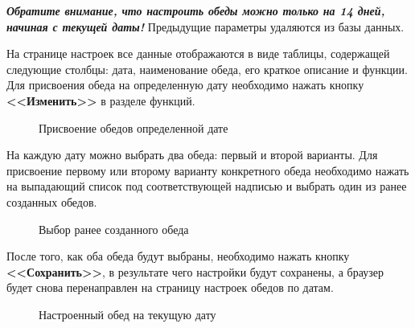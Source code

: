 \documentclass[a4paper]{article}
\begin{document}
\textbf{\textit{Обратите внимание, что настроить обеды можно только на 14 дней, начиная с текущей даты!}} Предыдущие параметры удаляются из базы данных.

На странице настроек все данные отображаются в виде таблицы, содержащей следующие столбцы: дата, наименование обеда, его краткое описание и функции. Для присвоения обеда на определенную дату необходимо нажать кнопку \textbf{<<Изменить>>} в разделе функций.

\begin{figure}[h]
\caption{Присвоение обедов определенной дате}
\label{fig:image22}
\end{figure}

На каждую дату можно выбрать два обеда: первый и второй варианты. Для присвоение первому или второму варианту конкретного обеда необходимо нажать на выпадающий список под соответствующей надписью и выбрать один из ранее созданных обедов.

\begin{figure}[h]
\caption{Выбор ранее созданного обеда}
\label{fig:image23}
\end{figure}

После того, как оба обеда будут выбраны, необходимо нажать кнопку \textbf{<<Сохранить>>}, в результате чего настройки будут сохранены, а браузер будет снова перенаправлен на страницу настроек обедов по датам.

\begin{figure}[h]
\caption{Настроенный обед на текущую дату}
\label{fig:image24}
\end{figure}
\end{document}
